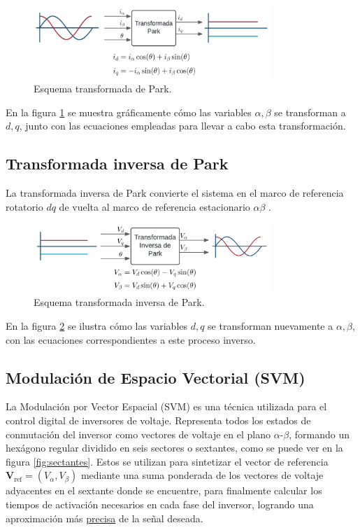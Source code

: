 \documentclass[11pt]{report}
\begin{document}
\begin{figure}[ht]
	\centering
	\includegraphics[width=0.8\textwidth]{imagenes/Diagramas/park.png}
	\caption{Esquema transformada de Park.}
	\label{fig:park_transform}
\end{figure}
\FloatBarrier

En la figura \ref{fig:park_transform} se muestra gráficamente cómo las variables \(\alpha, \beta\) se transforman a \(d, q\), junto con las ecuaciones empleadas para llevar a cabo esta transformación.

\subsection{Transformada inversa de Park}
La transformada inversa de Park convierte el sistema en el marco de referencia rotatorio \(dq\) de vuelta al marco de referencia estacionario \(\alpha\beta\) \cite{AN1078}.

\begin{figure}[ht]
	\centering
	\includegraphics[width=0.8\textwidth]{imagenes/Diagramas/park_inv.png}
	\caption{Esquema transformada inversa de Park.}
	\label{fig:park_inv_transform}
\end{figure}
\FloatBarrier

En la figura \ref{fig:park_inv_transform} se ilustra cómo las variables \(d, q\) se transforman nuevamente a \(\alpha, \beta\), con las ecuaciones correspondientes a este proceso inverso.

\subsection{Modulación de Espacio Vectorial (SVM)}
La Modulación por Vector Espacial (SVM) es una técnica utilizada para el control digital de inversores de voltaje. Representa todos los estados de conmutación del inversor como vectores de voltaje en el plano $\alpha$-$\beta$, formando un hexágono regular dividido en seis sectores o sextantes, como se puede ver en la figura \ref{fig:sectantes}. Estos se utilizan para sintetizar el vector de referencia $\mathbf{V}_{\text{ref}}=(V_{\alpha},V_{\beta})$ mediante una suma ponderada de los vectores de voltaje adyacentes en el sextante donde se encuentre, para finalmente calcular los tiempos de activación necesarios en cada fase del inversor, logrando una aproximación más \href{https://www.youtube.com/watch?v=NY0ffyEu6uo}{precisa} de la señal deseada.
\end{document}
